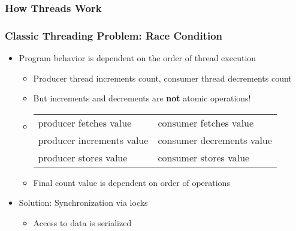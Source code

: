 
\begin{slide}
\frametitle{How Threads Work}

\vspace{3em}

\end{slide}


\begin{slide}
\frametitle{Classic Threading Problem: Race Condition}

\begin{itemize}
\item Program behavior is dependent on the order of thread execution
  \begin{itemize}
  \item Producer thread increments count, consumer thread decrements count
  \item But increments and decrements are \textbf{not} atomic operations!
    \item [] \vspace{0.5em}
    \begin{tabular}{l|l}
    \footnotesize{producer fetches value} & \footnotesize{consumer fetches value} \\
    \footnotesize{producer increments value} & \footnotesize{consumer decrements value} \\
    \footnotesize{producer stores value} & \footnotesize{consumer stores value} \\
    \end{tabular}
  \item \vspace{0.5em} Final count value is dependent on order of operations
  \end{itemize}

\vspace{1em}
\item Solution: Synchronization via locks
  \begin{itemize}
  \item Access to data is serialized
  \end{itemize}
\end{itemize}

\end{slide}


